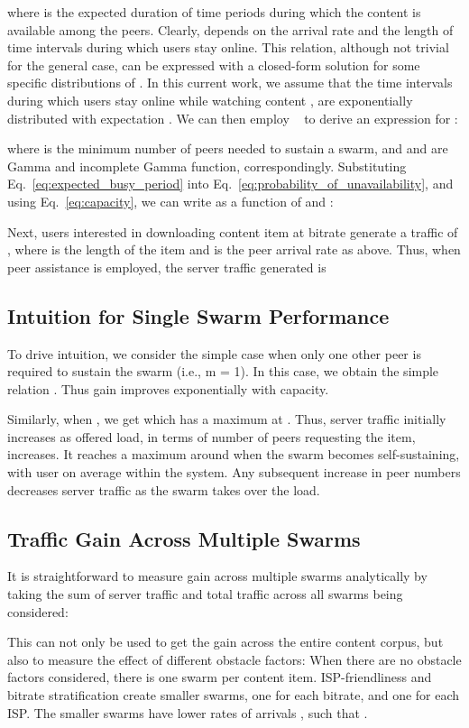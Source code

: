 \documentclass[10pt, conference, letterpaper]{IEEEtran}
\begin{document}
where  is the expected duration of time periods during which the content is available among the peers. 
Clearly,  depends on the arrival rate  and the length of time intervals  during which users stay online. This relation, although not trivial for the general case, can be expressed with a closed-form solution for some specific distributions of . In this current work, we assume that the time intervals during which users stay online while watching content , are exponentially distributed with expectation . 
We can then employ ~\cite[Lemma 3.3]{menasche2013content} to derive an expression for :

where  is the minimum number of peers needed to sustain a swarm, and  and  are Gamma and incomplete Gamma function, correspondingly. 
Substituting Eq.~\eqref{eq:expected_busy_period} into Eq.~\eqref{eq:probability_of_unavailability}, and using Eq.~\ref{eq:capacity}, we can write  as a function of  and :


Next, users interested in downloading content item  at bitrate  generate a traffic of , where  is the length of the item  and  is the peer arrival rate as above. Thus, when peer assistance is employed, the server traffic generated is
  

\subsection{Intuition for Single Swarm Performance}
To drive intuition, we consider the simple case when only one other peer is required to sustain the swarm (i.e., m = 1). In this case, we obtain the simple relation . Thus gain improves exponentially with capacity.

Similarly, when , we get  which has a maximum at . Thus, server traffic initially increases as offered load, in terms of number of peers requesting the item, increases. It reaches a maximum around when the swarm becomes self-sustaining, with  user on average within the system. Any subsequent increase in peer numbers decreases server traffic as the swarm takes over the load.


\subsection{Traffic Gain Across Multiple Swarms}
It is straightforward to measure gain across multiple swarms analytically by taking the sum of server traffic  and total traffic  across all swarms  being considered: 
   

This can not only be used to get the gain across the entire content corpus, but also to measure the effect of different obstacle factors: When there are no obstacle factors considered, there is one swarm per content item.  ISP-friendliness and bitrate stratification create smaller swarms, one for each bitrate, and one for each ISP. The smaller swarms have lower rates of arrivals , such that . 
\end{document}
